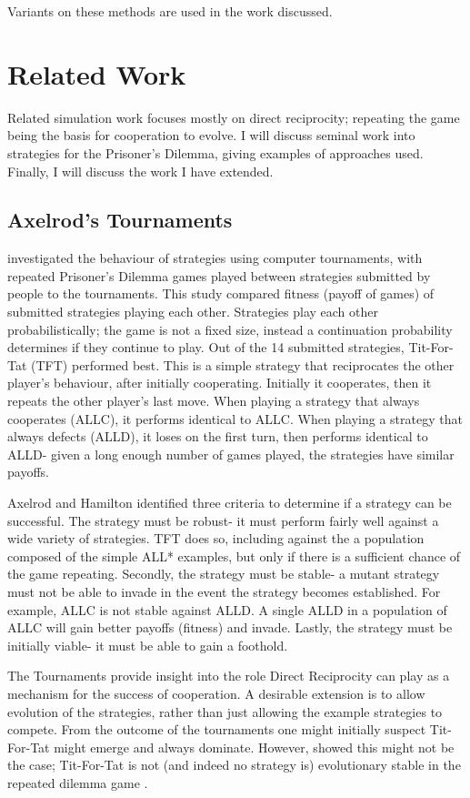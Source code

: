 \documentclass[a4paper,11pt,bcshonoursthesis,singlespace,twoside,thesisdraft,pdflatex]{cssethesis}
\begin{document}
Variants on these methods are used in the work discussed.
\section{Related Work}
\label{sec:relatedWork}
Related simulation work focuses mostly on direct reciprocity; repeating the game being the basis for cooperation to evolve. 
I will discuss seminal work into strategies for the Prisoner's Dilemma, giving examples of approaches used. Finally, I will discuss the work I have extended.
\subsection{Axelrod's Tournaments}
\citet{axelrod:Science:1981} investigated the behaviour of strategies using computer tournaments, with repeated Prisoner's Dilemma games played between strategies submitted by people to the tournaments. 
This study compared fitness (payoff of games) of submitted strategies playing each other. 
Strategies play each other probabilistically; the game is not a fixed size, instead a continuation probability determines if they continue to play. Out of the 14 submitted strategies, Tit-For-Tat (TFT) performed best. 
This is a simple strategy that reciprocates the other player's behaviour, after initially cooperating. 
Initially it cooperates, then it repeats the other player's last move. 
When playing a strategy that always cooperates (ALLC), it performs identical to ALLC. 
When playing a strategy that always defects (ALLD), it loses on the first turn, then performs identical to ALLD- given a long enough number of games played, the strategies have similar payoffs. 

Axelrod and Hamilton identified three criteria to determine if a strategy can be successful. The strategy must be robust- it must perform fairly well against a wide variety of strategies. TFT does so, including against the a population composed of the simple ALL* examples, but only if there is a sufficient chance of the game repeating. Secondly, the strategy must be stable- a mutant strategy must not be able to invade in the event the strategy becomes established. For example, ALLC is not stable against ALLD. 
A single ALLD in a population of ALLC will gain better payoffs (fitness) and invade. 
Lastly, the strategy must be initially viable- it must be able to gain a foothold. 

The Tournaments provide insight into the role Direct Reciprocity can play as a mechanism for the success of cooperation. 
A desirable extension is to allow evolution of the strategies, rather than just allowing the example strategies to compete. 
From the outcome of the tournaments one might initially suspect Tit-For-Tat might emerge and always dominate. However, \citet{boyd1987no} showed this might not be the case; Tit-For-Tat is not (and indeed no strategy is) evolutionary stable in the repeated dilemma game \citep{boyd1987no, van2010and}. 
\end{document}

